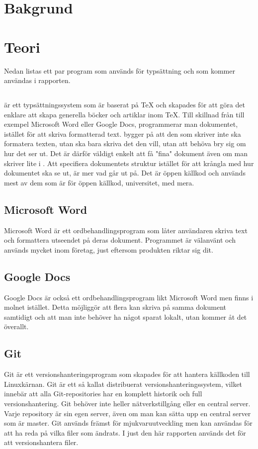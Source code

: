 \section{Bakgrund}
\label{sec:background-tuhkala}


\section{Teori}
\label{sec:theory-tuhkala}
Nedan listas ett par program som används för typsättning och som kommer användas i rapporten.
\subsection{\latex}
\latex är ett typsättningssystem som är baserat på TeX och skapades för att göra det enklare att skapa generella böcker och artiklar inom TeX. Till skillnad från till exempel Microsoft Word eller Google Docs, programmerar man dokumentet, istället för att skriva formatterad text. \latex bygger på att den som skriver inte ska formatera texten, utan ska bara skriva det den vill, utan att behöva bry sig om hur det ser ut.  Det är därför väldigt enkelt att få "fina" dokument även om man skriver lite i \latex. Att specifiera dokumentets struktur istället för att krångla med hur dokumentet ska se ut, är mer vad \latex går ut på. Det är öppen källkod och används mest av dem som är för öppen källkod, universitet, med mera.

\subsection{Microsoft Word}
Microsoft Word är ett ordbehandlingsprogram som låter användaren skriva text och formattera utseendet på deras dokument. Programmet är välanvänt och används mycket inom företag, just eftersom produkten riktar sig dit.

\subsection{Google Docs}
Google Docs är också ett ordbehandlingsprogram likt Microsoft Word men finns i molnet istället. Detta möjliggör att flera kan skriva på samma dokument samtidigt och att man inte behöver ha något sparat lokalt, utan kommer åt det överallt.

\subsection{Git}
Git är ett versionshanteringsprogram som skapades för att hantera källkoden till Linuxkärnan. Git är ett så kallat distribuerat versionshanteringssystem, vilket innebär att alla Git-repositories har en komplett historik och full versionshantering. Git behöver inte heller nätverkstillgång eller en central server. Varje repository är sin egen server, även om man kan sätta upp en central server som är master. Git används främst för mjukvaruutveckling men kan användas för att ha reda på vilka filer som ändrats. I just den här rapporten används det för att versionshantera \latex filer.

